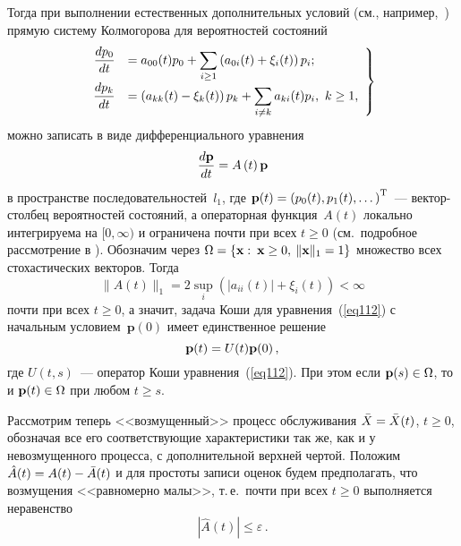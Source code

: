\begin{multicols}{2}
Тогда при выполнении естественных дополнительных условий (см., например,~\cite{z08b}) 
прямую сис\-те\-му Колмогорова для вероятностей состояний
\begin{equation}
 \left.
\begin{array}{rl}
\!\!\!\!\fr{dp_0}{dt} &= \displaystyle a_{00} (t)p_0 +\sum\limits_{i \ge 1} \left(a_{0i}(t)+ \xi_i(t)\right)p_i;  \\[9pt]
\!\!\!\!\fr{dp_k}{dt} &= \displaystyle\left(a_{kk}(t)-\xi_k(t)\right)p_{k} +\sum\limits_{i \neq k} a_{ki}(t)p_i,\  k \ge 1,
\end{array}
\right\} \!\!
\label{eq111}
\end{equation}
можно записать в виде дифференциального уравнения
\begin{equation}
\displaystyle\frac{\displaystyle d\mathbf{p}\mathstrut}{\displaystyle dt\mathstrut}=A \left( t\right) \mathbf {p}
\label{eq112}
\end{equation}
в пространстве последовательностей~$l_1$, где  
$\mathbf {p}(t)\hm=\left(p_0(t),p_1(t),\dots\right)^{\mathrm{T}}$~---
век\-тор-стол\-бец вероятностей со\-сто\-яний, а операторная функция~$A(t)$ 
локально интегрируема на $[0,\infty)$  и ограничена почти при всех $t \ge 0$ 
(см.\  подробное рассмотрение в \cite{z06}).
Обозначим через $\Omega\hm=\left\{{\bf x}: \: {\bf x}\geq 0,\: \|{\bf
x}\|_1\hm=1\right\}$ множество всех стохастических векторов.
Тогда
\begin{equation*}
\|A(t)\|_1  = 2 \sup\limits_{i}\left(|a_{ii}(t)|+ \xi_i(t)\right) < \infty 
\end{equation*}
почти при всех $t \ge 0$, а значит, задача Коши для
уравнения~(\ref{eq112}) с начальным условием~$\mathbf {p}(0)$ имеет
единственное решение
\begin{equation*}
{\bf p}(t) =  U(t){\bf p}(0)\,, 
\end{equation*}
\noindent где $U(t,s)$~--- оператор Коши уравнения~(\ref{eq112}). При
этом если ${\bf p}(s) \in \Omega$, то и ${\bf p}(t) \in \Omega$ при
любом  $t \ge s$.

Рассмотрим теперь <<возмущенный>> процесс обслуживания  $\bar{X}\hm=\bar{X}(t)$, $t\geq 0$, 
обозначая все его соответствующие характеристики так же, как и у 
невозмущенного процесса, с дополнительной верхней чертой. Положим 
$\hat{A} (t) \hm= {A} (t) \hm- \bar{A} (t)$ и для простоты записи 
оценок будем предполагать, что возмущения <<равномерно малы>>, т.\,е.\ 
почти при всех $t \ge 0$ выполняется неравенство
\begin{equation*}
\left\vert\hat{A}(t)\right\vert \le \varepsilon\,.
\end{equation*}


\end{multicols}
